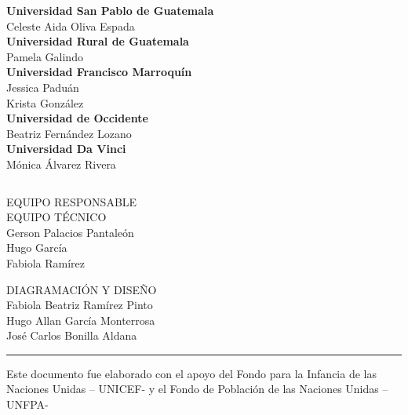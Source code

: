 \begin{multicols}{2}
\begin{center}
	\textbf{Universidad San Pablo de Guatemala}\\
	Celeste Aida Oliva Espada\\ [0.4cm]
	
	\textbf{Universidad Rural de Guatemala}\\
	Pamela Galindo\\ [0.4cm]
	
	\textbf{Universidad Francisco Marroquín}\\
	Jessica Paduán\\
	Krista González\\ [0.4cm]
	
	\textbf{Universidad de Occidente}\\
	Beatriz Fernández Lozano\\ [0.4cm]
	
	\textbf{Universidad Da Vinci}\\
	Mónica Álvarez Rivera\\[0.8cm]
	
	
\end{center}

\end{multicols}
\setcounter{page}{0}\cleardoublepage
\clearpage

$\ $
\vspace{1cm}

\begin{center}
	{\Bold \LARGE EQUIPO RESPONSABLE}\\[2cm]
	

	
	
	{\Bold \large \color{color1!89!black} EQUIPO TÉCNICO}\\[0.2cm]
	Gerson Palacios Pantaleón\\
	Hugo García\\
	Fabiola Ramírez
	
{\Bold \large \color{color1!89!black} DIAGRAMACIÓN Y DISEÑO}\\[0.2cm]
Fabiola Beatriz Ramírez Pinto\\
Hugo Allan García Monterrosa\\
José Carlos Bonilla Aldana\\[8cm]



\end{center}
\vfill 
\hrule
Este documento fue elaborado con el apoyo del Fondo para la Infancia de las Naciones Unidas – UNICEF- y el Fondo de Población de las Naciones Unidas – UNFPA-
\setcounter{page}{0}\cleardoublepage



